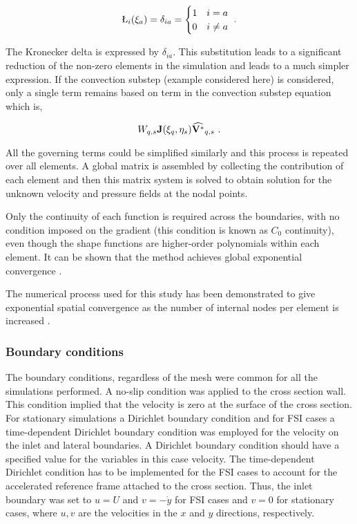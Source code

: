  \begin{gather}
 \label{eq:kronecker}
 \L_{i}(\compone_{a}) = \delta_{ia} = \begin{cases}
 1 & i = a    \\
 0 & i \neq a \\
 \end{cases} ~.
 \end{gather}
 
 The Kronecker delta is expressed by $\delta_{ia}$. This substitution leads to a significant reduction of the non-zero elements in the simulation and leads to a much simpler expression. If the convection substep (example considered here) is considered, only a single term remains based on \Vint term in the convection substep equation which is,


 \begin{equation} \centering
 W_{q,s}\jacobian(\compone_{q},\comptwo_{s})\widehat{\Vint}_{q,s} ~.
 \end{equation}
 
 
 All the governing terms could be simplified similarly and this process is repeated over all elements. A global matrix is assembled by collecting the contribution of each element and then this matrix system is solved to obtain solution for the unknown velocity and pressure fields at the nodal points. 
 
 Only the continuity of each function is required across the boundaries, with no condition imposed on the gradient (this condition
 is known as $C_{0}$ continuity), even though the shape functions are higher-order polynomials within each element. It can be shown that the method achieves global exponential convergence \citep{karniadakis2005}.  
 
 The numerical process used for this study has been demonstrated to give
 exponential spatial convergence as the number of internal nodes per
 element is increased \citep{Thompson1996a}.
 


\subsubsection{Boundary conditions}

The boundary conditions, regardless of the mesh  were common for all the simulations performed. A no-slip condition was applied to the cross section wall. This condition implied that the velocity is zero at the surface of the cross section. For stationary simulations a Dirichlet boundary condition and for FSI cases a time-dependent Dirichlet boundary condition was employed for the velocity on the inlet and lateral boundaries. A Dirichlet boundary condition should have a specified value for the variables \citep{kreyszig2010} in this case velocity. The time-dependent Dirichlet condition has to be implemented for the FSI cases to account for the accelerated reference frame attached to the cross section. Thus, the inlet boundary was set to $u=U$ and $v=-\dot{y}$ for FSI cases and $v=0$ for stationary cases, where $u,v$ are the velocities in the $x$ and $y$ directions, respectively.


